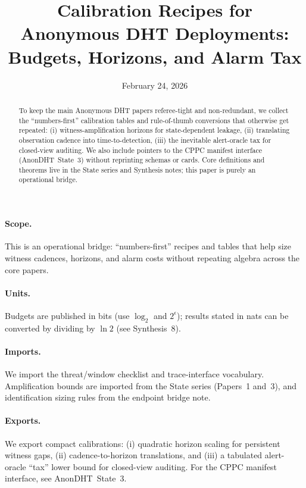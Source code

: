 \documentclass[11pt]{article}
\title{Calibration Recipes for Anonymous DHT Deployments:\\ Budgets, Horizons, and Alarm Tax}
\author{}
\date{February 24, 2026}
\begin{document}
\maketitle

\begin{abstract}
To keep the main Anonymous DHT papers referee-tight and non-redundant, we collect the ``numbers-first'' calibration tables and rule-of-thumb conversions that otherwise get repeated:
(i) witness-amplification horizons for state-dependent leakage,
(ii) translating observation cadence into time-to-detection,
(iii) the inevitable alert-oracle tax for closed-view auditing.
We also include pointers to the CPPC manifest interface (AnonDHT~State~3) without reprinting schemas or cards.\cite{state3}
Core definitions and theorems live in the State series and Synthesis notes; this paper is purely an operational bridge.
\end{abstract}
\paragraph{Scope.}
This is an operational bridge: ``numbers-first'' recipes and tables that help size witness cadences, horizons, and alarm costs without repeating algebra across the core papers.

\paragraph{Units.} Budgets are published in bits (use $\log_2$ and $2^{\epsilon}$); results stated in nats can be converted by dividing by $\ln 2$ (see Synthesis~8).\cite{series:notation}

\paragraph{Imports.}
We import the threat/window checklist and trace-interface vocabulary.\cite{series:threatwindows,series:traceifaces}
Amplification bounds are imported from the State series (Papers~1 and~3), and identification sizing rules from the endpoint bridge note.\cite{state1,state3,synth5}

\paragraph{Exports.}
We export compact calibrations: (i) quadratic horizon scaling for persistent witness gaps, (ii) cadence-to-horizon translations, and (iii) a tabulated alert-oracle ``tax'' lower bound for closed-view auditing.
For the CPPC manifest interface, see AnonDHT~State~3.\cite{state3}
\end{document}
